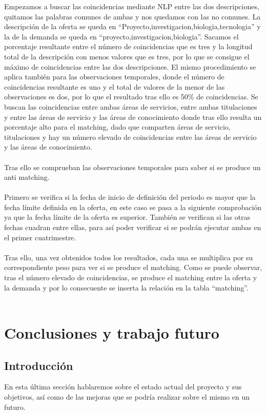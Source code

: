 \documentclass[11pt]{book}
\begin{document}
Empezamos a buscar las coincidencias mediante NLP entre las dos descripciones, quitamos las palabras comunes de ambas y nos quedamos con las no comunes. La descripción de la oferta se queda en “Proyecto,investigacion,biologia,tecnologia” y la de la demanda se queda en “proyecto,investigacion,biologia”. Sacamos el porcentaje resultante entre el número de coincidencias que es tres y la longitud total de la descripción con menos valores que es tres, por lo que se consigue el máximo de coincidencias entre las dos descripciones. El mismo procedimiento se aplica también para las observaciones temporales, donde el número de coincidencias resultante es uno y el total de valores de la menor de las observaciones es dos, por lo que el resultado tras ello es 50\% de coincidencias. Se buscan las coincidencias entre ambas áreas de servicios, entre ambas  titulaciones y entre las áreas de servicio y las áreas de conocimiento donde tras ello resulta un porcentaje alto para el matching, dado que comparten áreas de servicio, titulaciones y hay un número elevado de coincidencias entre las áreas de servicio y las áreas de conocimiento.\\\\
Tras ello se comprueban las observaciones temporales para saber si se produce un anti matching.\\\\
Primero se verifica si la fecha de inicio de definición del periodo es mayor que la fecha límite definida en la oferta, en este caso se pasa a la siguiente comprobación ya que la fecha límite de la oferta es superior. También se verifican si las otras fechas cuadran entre ellas, para así poder verificar si se podrán ejecutar ambas en el primer cuatrimestre. \\\\
Tras ello, una vez obtenidos todos los resultados, cada una se multiplica por su correspondiente peso para ver si se produce el matching. Como se puede observar, tras el número elevado de coincidencias, se produce el matching entre la oferta y la demanda y por lo consecuente se inserta la relación en la tabla “matching”.\\\\


\chapter{Conclusiones y trabajo futuro}
\section{Introducción}
En esta última sección hablaremos sobre el estado actual del proyecto y sus objetivos, así como de las mejoras que se podría realizar sobre el mismo en un futuro.\\\\
\end{document}
